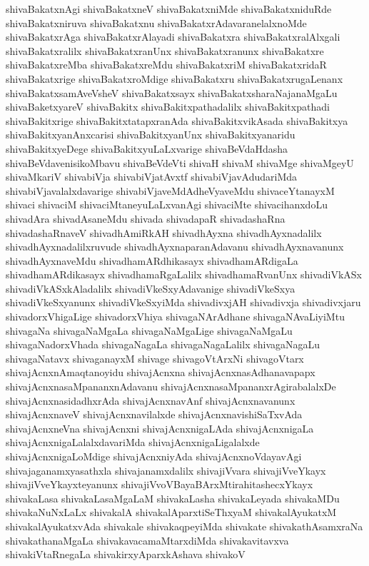 {shivaBakatxnAgi
shivaBakatxneV
shivaBakatxniMde
shivaBakatxniduRde
shivaBakatxniruva
shivaBakatxnu
shivaBakatxrAdavaranelalxnoMde
shivaBakatxrAga
shivaBakatxrAlayadi
shivaBakatxra
shivaBakatxralAlxgali
shivaBakatxralilx
shivaBakatxranUnx
shivaBakatxranunx
shivaBakatxre
shivaBakatxreMba
shivaBakatxreMdu
shivaBakatxriM
shivaBakatxridaR
shivaBakatxrige
shivaBakatxroMdige
shivaBakatxru
shivaBakatxrugaLenanx
shivaBakatxsamAveVsheV
shivaBakatxsayx
shivaBakatxsharaNajanaMgaLu
shivaBaketxyareV
shivaBakitx
shivaBakitxpathadalilx
shivaBakitxpathadi
shivaBakitxrige
shivaBakitxtatapxranAda
shivaBakitxvikAsada
shivaBakitxya
shivaBakitxyanAnxcarisi
shivaBakitxyanUnx
shivaBakitxyanaridu
shivaBakitxyeDege
shivaBakitxyuLaLxvarige
shivaBeVdaHdasha
shivaBeVdavenisikoMbavu
shivaBeVdeVti
shivaH
shivaM
shivaMge
shivaMgeyU
shivaMkariV
shivabiVja
shivabiVjatAvxtf
shivabiVjavAdudariMda
shivabiVjavalalxdavarige
shivabiVjaveMdAdheVyaveMdu
shivaceYtanayxM
shivaci
shivaciM
shivaciMtaneyuLaLxvanAgi
shivaciMte
shivacihanxdoLu
shivadAra
shivadAsaneMdu
shivada
shivadapaR
shivadashaRna
shivadashaRnaveV
shivadhAmiRkAH
shivadhAyxna
shivadhAyxnadalilx
shivadhAyxnadalilxruvude
shivadhAyxnaparanAdavanu
shivadhAyxnavanunx
shivadhAyxnaveMdu
shivadhamARdhikasayx
shivadhamARdigaLa
shivadhamARdikasayx
shivadhamaRgaLalilx
shivadhamaRvanUnx
shivadiVkASx
shivadiVkASxkAladalilx
shivadiVkeSxyAdavanige
shivadiVkeSxya
shivadiVkeSxyanunx
shivadiVkeSxyiMda
shivadivxjAH
shivadivxja
shivadivxjaru
shivadorxVhigaLige
shivadorxVhiya
shivagaNArAdhane
shivagaNAvaLiyiMtu
shivagaNa
shivagaNaMgaLa
shivagaNaMgaLige
shivagaNaMgaLu
shivagaNadorxVhada
shivagaNagaLa
shivagaNagaLalilx
shivagaNagaLu
shivagaNatavx
shivaganayxM
shivage
shivagoVtArxNi
shivagoVtarx
shivajAcnxnAmaqtanoyidu
shivajAcnxna
shivajAcnxnasAdhanavapapx
shivajAcnxnasaMpananxnAdavanu
shivajAcnxnasaMpananxrAgirabalalxDe
shivajAcnxnasidadhxrAda
shivajAcnxnavAnf
shivajAcnxnavanunx
shivajAcnxnaveV
shivajAcnxnavilalxde
shivajAcnxnavishiSaTxvAda
shivajAcnxneVna
shivajAcnxni
shivajAcnxnigaLAda
shivajAcnxnigaLa
shivajAcnxnigaLalalxdavariMda
shivajAcnxnigaLigalalxde
shivajAcnxnigaLoMdige
shivajAcnxniyAda
shivajAcnxnoVdayavAgi
shivajaganamxyasathxla
shivajanamxdalilx
shivajiVvara
shivajiVveYkayx
shivajiVveYkayxteyanunx
shivajiVvoVBayaBArxMtirahitashecxYkayx
shivakaLasa
shivakaLasaMgaLaM
shivakaLasha
shivakaLeyada
shivakaMDu
shivakaNuNxLaLx
shivakalA
shivakalAparxtiSeThxyaM
shivakalAyukatxM
shivakalAyukatxvAda
shivakale
shivakaqpeyiMda
shivakate
shivakathAsamxraNa
shivakathanaMgaLa
shivakavacamaMtarxdiMda
shivakavitavxva
shivakiVtaRnegaLa
shivakirxyAparxkAshava
shivakoV
}

